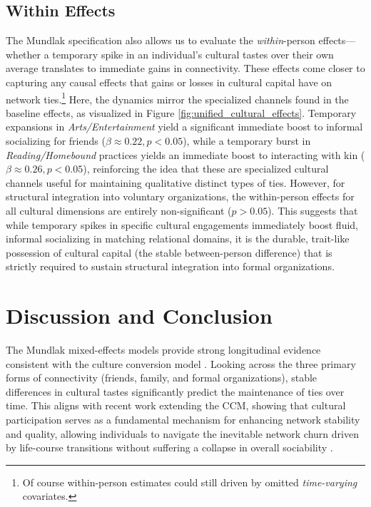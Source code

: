 \documentclass[
]{article}
\begin{document}
\subsection{Within Effects}
The Mundlak specification also allows us to evaluate the \textit{within}-person effects---whether a temporary spike in an individual's cultural tastes over their own average translates to immediate gains in connectivity. These effects come closer to capturing any causal effects that gains or losses in cultural capital have on network ties.\footnote{Of course within-person estimates could still driven by omitted \textit{time-varying} covariates.} Here, the dynamics mirror the specialized channels found in the baseline effects, as visualized in Figure \ref{fig:unified_cultural_effects}. Temporary expansions in \emph{Arts/Entertainment} yield a significant immediate boost to informal socializing for friends ($\beta \approx 0.22, p < 0.05$), while a temporary burst in \emph{Reading/Homebound} practices yields an immediate boost to interacting with kin ($\beta \approx 0.26, p < 0.05$), reinforcing the idea that these are specialized cultural channels useful for maintaining qualitative distinct types of ties. However, for structural integration into voluntary organizations, the within-person effects for all cultural dimensions are entirely non-significant ($p > 0.05$). This suggests that while temporary spikes in specific cultural engagements immediately boost fluid, informal socializing in matching relational domains, it is the durable, trait-like possession of cultural capital (the stable between-person difference) that is strictly required to sustain structural integration into formal organizations.

\section{Discussion and Conclusion}\label{discussion-and-conclusion}

The Mundlak mixed-effects models provide strong longitudinal evidence consistent with the culture conversion model \citep{lizardo2006, lizardo2024, lizardo2025}. Looking across the three primary forms of connectivity (friends, family, and formal organizations), stable differences in cultural tastes significantly predict the maintenance of ties over time. This aligns with recent work extending the CCM, showing that cultural participation serves as a fundamental mechanism for enhancing network stability and quality, allowing individuals to navigate the inevitable network churn driven by life-course transitions without suffering a collapse in overall sociability \citep{jaeger2026, meuleman2023, lin2022, weiss2022}.
\end{document}
